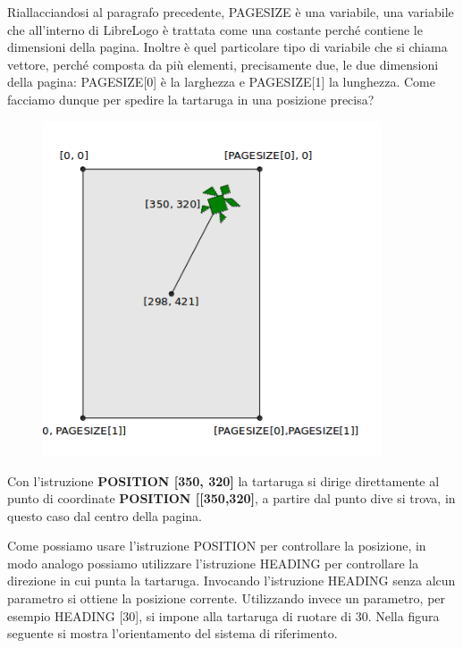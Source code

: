 Riallacciandosi al paragrafo precedente, PAGESIZE è una variabile, una variabile che all'interno di LibreLogo è trattata come una costante perché contiene le dimensioni della pagina. Inoltre è quel particolare tipo di variabile che si chiama vettore, perché composta da più elementi, precisamente due, le due dimensioni della pagina: PAGESIZE[0] è la larghezza e PAGESIZE[1] la lunghezza.
Come facciamo dunque per spedire la tartaruga in una posizione precisa?

\vskip 1cm

\begin{figure}[H]
   \centering
   \includegraphics[width=10.0cm,trim=8 8 8 8,clip]{./images/disegnare/disegnare-31.png}
   \label{dis-31}
\end{figure}

\vskip 1cm

Con l'istruzione \textbf{POSITION [350, 320]} la tartaruga si dirige direttamente al punto di coordinate \textbf{POSITION [[350,320]}, a partire dal punto dive si trova, in questo caso dal centro della pagina.

Come possiamo usare l'istruzione POSITION per controllare la posizione, in modo analogo possiamo utilizzare l'istruzione HEADING per controllare la direzione in cui punta la tartaruga. Invocando l'istruzione HEADING senza alcun parametro si ottiene la posizione corrente. Utilizzando invece un parametro, per esempio HEADING [30], si impone alla tartaruga di ruotare di 30\degree. Nella figura seguente si mostra l'orientamento del sistema di riferimento.

\vskip 1cm


